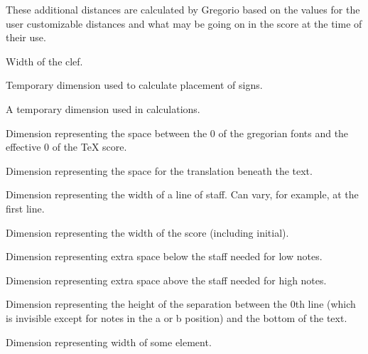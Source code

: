 These additional distances are calculated by Gregorio based on the values for the user customizable distances and what may be going on in the score at the time of their use.

Width of the clef.

Temporary dimension used to calculate placement of signs.

A temporary dimension used in calculations.

Dimension representing the space between the 0 of the gregorian fonts and the effective 0 of the TeX score.

Dimension representing the space for the translation beneath the text.

Dimension representing the width of a line of staff.  Can vary, for
example, at the first line.

Dimension representing the width of the score (including initial).

Dimension representing extra space below the staff needed for low notes.

Dimension representing extra space above the staff needed for high notes.

Dimension representing the height of the separation between the 0th
line (which is invisible except for notes in the a or b position) and
the bottom of the text.

Dimension representing width of some element.

